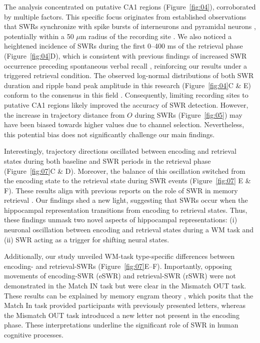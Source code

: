 \documentclass[final,3p,times,twocolumn]{elsarticle}
\begin{document}
The analysis concentrated on putative CA1 regions (Figure~\ref{fig:04}), corroborated by multiple factors. This specific focus originates from established observations that SWRs synchronize with spike bursts of interneurons and pyramidal neurons \cite{buzsaki_two-stage_1989} \cite{quyen_cell_2008} \cite{royer_control_2012} \cite{hajos_input-output_2013}, potentially within a 50 $\mu$m radius of the recording site \cite{schomburg_spiking_2012}. We also noticed a heightened incidence of SWRs during the first 0--400 ms of the retrieval phase (Figure~\ref{fig:04}D), which is consistent with previous findings of increased SWR occurrence preceding spontaneous verbal recall \cite{norman_hippocampal_2019} \cite{norman_hippocampal_2021}, reinforcing our results under a triggered retrieval condition. The observed log-normal distributions of both SWR duration and ripple band peak amplitude in this research (Figure~\ref{fig:04}C \& E) conform to the consensus in this field \cite{liu_consensus_2022}. Consequently, limiting recording sites to putative CA1 regions likely improved the accuracy of SWR detection. However, the increase in trajectory distance from $O$ during SWRs (Figure~\ref{fig:05}) may have been biased towards higher values due to channel selection. Nevertheless, this potential bias does not significantly challenge our main findings.

Interestingly, trajectory directions oscillated between encoding and retrieval states during both baseline and SWR periods in the retrieval phase (Figure~\ref{fig:07}C \& D). Moreover, the balance of this oscillation switched from the encoding state to the retrieval state during SWR events (Figure~\ref{fig:07} E \& F). These results align with previous reports on the role of SWR in memory retrieval \cite{norman_hippocampal_2019} \cite{norman_hippocampal_2021}. Our findings shed a new light, suggesting that SWRs occur when the hippocampal representation transitions from encoding to retrieval states. Thus, these findings unmask two novel aspects of hippocampal representations: (i) neuronal oscillation between encoding and retrieval states during a WM task and (ii) SWR acting as a trigger for shifting neural states.

Additionally, our study unveiled WM-task type-specific differences between encoding- and retrieval-SWRs (Figure~\ref{fig:07}E--F). Importantly, opposing movements of encoding-SWR (eSWR) and retrieval-SWR (rSWR) were not demonstrated in the Match IN task but were clear in the Mismatch OUT task. These results can be explained by memory engram theory \cite{liu_optogenetic_2012}, which posits that the Match In task provided participants with previously presented letters, whereas the Mismatch OUT task introduced a new letter not present in the encoding phase. These interpretations underline the significant role of SWR in human cognitive processes.
\end{document}
